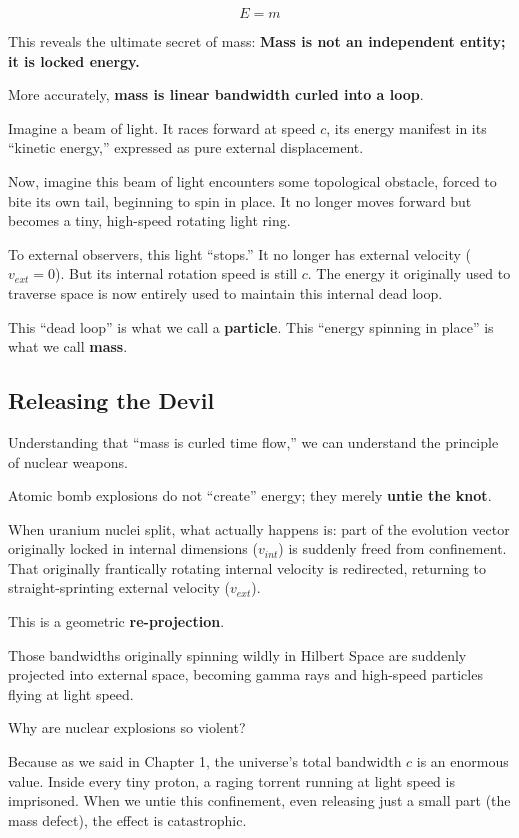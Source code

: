 \documentclass[11pt,a4paper,twoside]{book}
\begin{document}
$$E = m$$

This reveals the ultimate secret of mass: \textbf{Mass is not an independent entity; it is locked energy.}

More accurately, \textbf{mass is linear bandwidth curled into a loop}.

Imagine a beam of light. It races forward at speed $c$, its energy manifest in its ``kinetic energy,'' expressed as pure external displacement.

Now, imagine this beam of light encounters some topological obstacle, forced to bite its own tail, beginning to spin in place. It no longer moves forward but becomes a tiny, high-speed rotating light ring.

To external observers, this light ``stops.'' It no longer has external velocity ($v_{ext}=0$). But its internal rotation speed is still $c$. The energy it originally used to traverse space is now entirely used to maintain this internal dead loop.

This ``dead loop'' is what we call a \textbf{particle}. This ``energy spinning in place'' is what we call \textbf{mass}.

\subsection{Releasing the Devil}

Understanding that ``mass is curled time flow,'' we can understand the principle of nuclear weapons.

Atomic bomb explosions do not ``create'' energy; they merely \textbf{untie the knot}.

When uranium nuclei split, what actually happens is: part of the evolution vector originally locked in internal dimensions ($v_{int}$) is suddenly freed from confinement. That originally frantically rotating internal velocity is redirected, returning to straight-sprinting external velocity ($v_{ext}$).

This is a geometric \textbf{re-projection}.

Those bandwidths originally spinning wildly in Hilbert Space are suddenly projected into external space, becoming gamma rays and high-speed particles flying at light speed.

Why are nuclear explosions so violent?

Because as we said in Chapter 1, the universe's total bandwidth $c$ is an enormous value. Inside every tiny proton, a raging torrent running at light speed is imprisoned. When we untie this confinement, even releasing just a small part (the mass defect), the effect is catastrophic.
\end{document}
